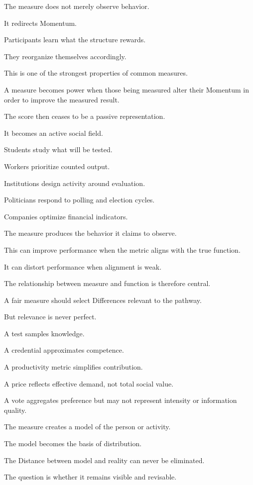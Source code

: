 The measure does not merely observe behavior.

It redirects Momentum.

Participants learn what the structure rewards.

They reorganize themselves accordingly.

This is one of the strongest properties of common measures.

A measure becomes power when those being measured alter their Momentum in order to improve the measured result.

The score then ceases to be a passive representation.

It becomes an active social field.

Students study what will be tested.

Workers prioritize counted output.

Institutions design activity around evaluation.

Politicians respond to polling and election cycles.

Companies optimize financial indicators.

The measure produces the behavior it claims to observe.

This can improve performance when the metric aligns with the true function.

It can distort performance when alignment is weak.

The relationship between measure and function is therefore central.

A fair measure should select Differences relevant to the pathway.

But relevance is never perfect.

A test samples knowledge.

A credential approximates competence.

A productivity metric simplifies contribution.

A price reflects effective demand, not total social value.

A vote aggregates preference but may not represent intensity or information quality.

The measure creates a model of the person or activity.

The model becomes the basis of distribution.

The Distance between model and reality can never be eliminated.

The question is whether it remains visible and revisable.

